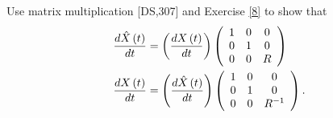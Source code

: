 \begin{exercise}
Use matrix multiplication [DS,307] and Exercise \ref{8} to show that%
\begin{align*}
\frac{d\hat{X}\left(  t\right)  }{dt}  &  =\left(  \frac{dX\left(  t\right)
}{dt}\right)  \left(
\begin{array}
[c]{ccc}%
1 & 0 & 0\\
0 & 1 & 0\\
0 & 0 & R
\end{array}
\right) \\
\frac{dX\left(  t\right)  }{dt}  &  =\left(  \frac{d\hat{X}\left(  t\right)
}{dt}\right)  \left(
\begin{array}
[c]{ccc}%
1 & 0 & 0\\
0 & 1 & 0\\
0 & 0 & R^{-1}%
\end{array}
\right)  .
\end{align*}

\end{exercise}

